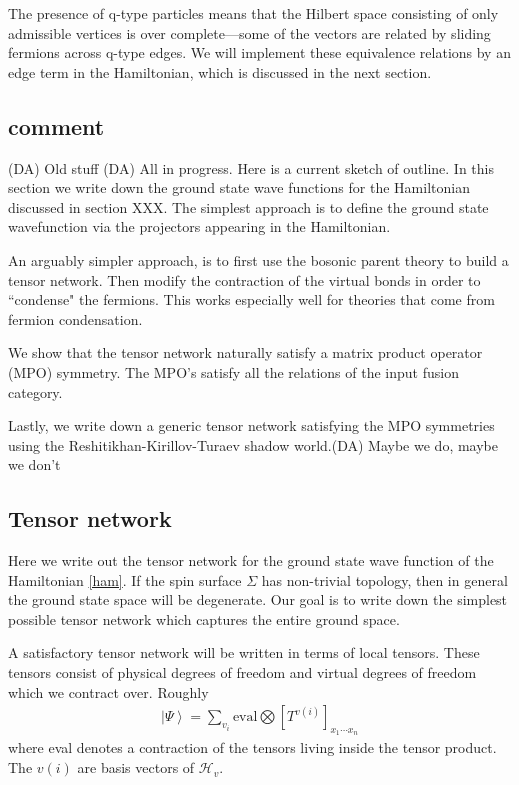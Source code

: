 \documentclass[12pt,a4paper]{article}
\newcommand{\mch}{\mathcal{H}}
\newcommand{\ket}[1]{\ensuremath{\left|#1\right\rangle}}
\newcommand{\dave}[1]{{\color{ao(english)}\footnotesize{(DA) #1}}}
\begin{document}
The presence of q-type particles means that the Hilbert space consisting of only admissible vertices is over complete---some of the vectors are related by sliding fermions across q-type edges.
We will implement these equivalence relations by an edge term in the Hamiltonian, which is discussed in the next section.
 
 


 
\subsection{comment}
\dave{Old stuff}
\dave{All in progress. Here is a current sketch of outline.}
In this section we write down the ground state wave functions for the Hamiltonian discussed in section XXX. 
The simplest approach is to define the ground state wavefunction via the projectors appearing in the Hamiltonian.

An arguably simpler approach, is to first use the bosonic parent theory to build a tensor network. 
Then modify the contraction of the virtual bonds in order to ``condense" the fermions. 
This works especially well for theories that come from fermion condensation.

We show that the tensor network naturally satisfy a matrix product operator (MPO) symmetry.
The MPO's satisfy all the relations of the input fusion category.

Lastly, we write down a generic tensor network satisfying the MPO symmetries using the Reshitikhan-Kirillov-Turaev shadow world.\dave{Maybe we do, maybe we don't}

\subsection{Tensor network}
Here we write out the tensor network for the ground state wave function of the Hamiltonian \eqref{ham}.
If the spin surface $\Sigma$ has non-trivial topology,
then in general the ground state space will be degenerate.
Our goal is to write down the simplest possible tensor network which captures the entire ground space. 

A satisfactory tensor network will be written in terms of local tensors. 
These tensors consist of physical degrees of freedom and virtual degrees of freedom which we contract over.
Roughly
\begin{align}
\ket{\Psi} =\sum_{v_i} \text{eval} \bigotimes \left[ T^{v(i)} \right]_{x_1 \cdots x_n} 
\end{align}
where eval denotes a contraction of the tensors living inside the tensor product.
The $v(i)$ are basis vectors of $\mch_v$. 
\end{document}
